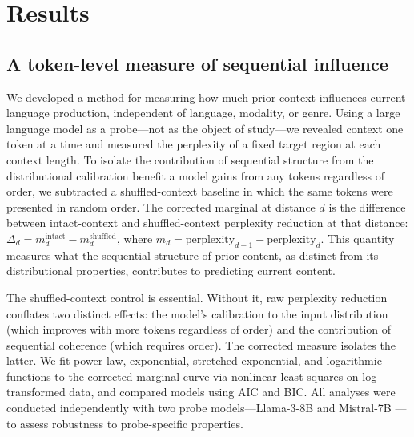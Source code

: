 \documentclass[9pt,twocolumn,twoside]{pnas-new}
\begin{document}
\Endparasplit


\section*{Results}

\subsection*{A token-level measure of sequential influence}

We developed a method for measuring how much prior context influences current language production, independent of language, modality, or genre. Using a large language model as a probe---not as the object of study---we revealed context one token at a time and measured the perplexity of a fixed target region at each context length. To isolate the contribution of sequential structure from the distributional calibration benefit a model gains from any tokens regardless of order, we subtracted a shuffled-context baseline in which the same tokens were presented in random order. The corrected marginal at distance $d$ is the difference between intact-context and shuffled-context perplexity reduction at that distance: $\Delta_d = m^{\text{intact}}_d - m^{\text{shuffled}}_d$, where $m_d = \text{perplexity}_{d-1} - \text{perplexity}_d$. This quantity measures what the sequential structure of prior content, as distinct from its distributional properties, contributes to predicting current content.

The shuffled-context control is essential. Without it, raw perplexity reduction conflates two distinct effects: the model's calibration to the input distribution (which improves with more tokens regardless of order) and the contribution of sequential coherence (which requires order). The corrected measure isolates the latter. We fit power law, exponential, stretched exponential, and logarithmic functions to the corrected marginal curve via nonlinear least squares on log-transformed data, and compared models using AIC and BIC. All analyses were conducted independently with two probe models---Llama-3-8B \cite{llama3} and Mistral-7B \cite{mistral7b}---to assess robustness to probe-specific properties.
\end{document}
